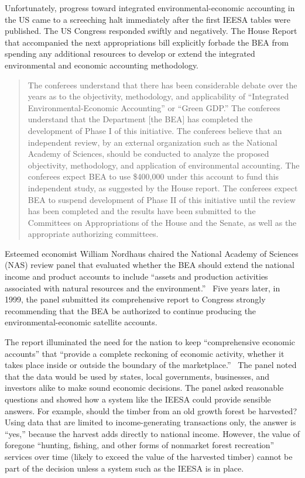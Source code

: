 Unfortunately, progress toward integrated environmental-economic accounting 
in the US came to a screeching halt immediately after the first IEESA tables were published. 
The US Congress responded swiftly and negatively. The House Report that 
accompanied the next appropriations bill explicitly forbade the BEA from spending  
any additional resources to develop or extend
the integrated environmental and economic accounting methodology. 

\begin{quote}
	The conferees understand that there has been considerable debate 
	over the years as to the objectivity, methodology, and applicability 
	of ``Integrated Environmental-Economic Accounting'' or ``Green GDP.''
	The conferees understand that the Department [the BEA]
	has completed the development of Phase I of this initiative. 
	The conferees believe that an independent review, 
	by an external organization such as the National Academy of Sciences, 
	should be conducted to analyze 
	the proposed objectivity, methodology, and application of environmental accounting. 
	The conferees expect BEA to use \$400,000 under this account 
	to fund this independent study, as suggested by the House report. 
	The conferees expect BEA to suspend development 
	of Phase II of this initiative 
	until the review has been completed and the results have been submitted 
	to the Committees on Appropriations of the House and the Senate, 
	as well as the appropriate authorizing committees.\cite{HR103708}
\end{quote}

Esteemed economist William Nordhaus chaired the 
National Academy of Sciences (NAS) review panel
that evaluated whether the BEA should extend 
the national income and product accounts to include 
``assets and production activities associated 
with natural resources and the environment.''~\cite[p.~2]{Nordhaus1999a} 
Five years later, in 1999, the panel submitted its comprehensive report 
to Congress strongly recommending that the BEA be authorized 
to continue producing the environmental-economic satellite accounts.\cite{Nordhaus1999a}

The report illuminated the need for the nation 
to keep ``comprehensive economic accounts'' that 
``provide a complete reckoning of economic activity, 
whether it takes place inside or outside 
the boundary of the marketplace.''~\cite[p.~29]{Nordhaus1999a}
The panel noted that the data would be used 
by states, local governments, businesses, and investors alike 
to make sound economic decisions. 
The panel asked reasonable questions and showed how a system like the IEESA
could provide sensible answers.
For example, should the timber from an old growth forest be harvested? 
Using data that are limited to income-generating transactions only, 
the answer is ``yes,''
because the harvest adds directly to national income. 
However, the value of foregone ``hunting, fishing, 
and other forms of nonmarket forest recreation'' 
services over time (likely to exceed the value of the harvested timber)
cannot be part of the decision unless 
a system such as the IEESA is in place.\cite[p.~30]{Nordhaus1999a}

